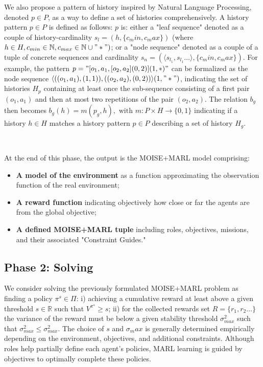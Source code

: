 \documentclass[sigconf,anonymous]{aamas}
\begin{document}
We also propose a pattern of history inspired by Natural Language Processing, denoted $p \in P$, as a way to define a set of histories comprehensively. A history pattern $p \in P$ is defined as follows: $p$ is: either a "leaf sequence" denoted as a couple of history-cardinality $s_l = (h, \{c_min,c_max\})$ (where $h \in H, c_{min} \in \mathbb{N}, c_{max} \in \mathbb{N} \cup "*")$; or a "node sequence" denoted as a couple of a tuple of concrete sequences and cardinality $s_n = (\langle s_{l_1}, s_{l_1}\dots \rangle, \{c_min,c_max\})$. For example, the pattern $p = \allowbreak "[o_1,a_1,[o_2,a_2](0,2)](1,*)"$ can be formalized as the node sequence $\allowbreak \langle ((o_1,a_1),(1,1)), ((o_2,a_2),(0,2))\rangle(1,"*")$, indicating the set of histories $H_p$ containing at least once the sub-sequence consisting of a first pair $(o_1,a_1)$ and then at most two repetitions of the pair $(o_2,a_2)$.
The relation $b_g$ then becomes $b_g(h) = m(p_g,h), \text{ with } m: P \times H \to \{0,1\}$ indicating if a history $h \in H$ matches a history pattern $p \in P$ describing a set of history $H_g$.

\

At the end of this phase, the output is the MOISE+MARL model comprising:
\begin{itemize}
    \item \textbf{A model of the environment} as a function approximating the observation function of the real environment;
    \item \textbf{A reward function} indicating objectively how close or far the agents are from the global objective;
    \item \textbf{A defined MOISE+MARL tuple} including roles, objectives, missions, and their associated "Constraint Guides."
\end{itemize}

\subsection{Phase 2: Solving}

We consider solving the previously formulated MOISE+MARL problem as finding a policy $\pi^s \in \Pi$: \quad i) achieving a cumulative reward at least above a given threshold $s \in \mathbb{R}$ such that $V^{\pi^s} \geq s$; \quad ii) for the collected rewards set $R = \{r_1, r_2\dots\}$ the variance of the reward must be below a given stability threshold $\sigma_{max}^2$ such that $\sigma_{max}^2 \leq \sigma_{max}^2$. The choice of $s$ and $\sigma_max$ is generally determined empirically depending on the environment, objectives, and additional constraints. Although roles help partially define each agent's policies, MARL learning is guided by objectives to optimally complete these policies.
\end{document}

